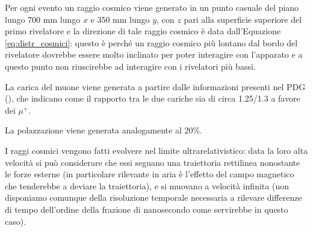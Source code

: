 Per ogni evento un raggio cosmico viene generato in un punto casuale del piano lungo 700 mm lungo $x$ e 350 mm lungo $y$, con $z$ pari alla superficie superiore del primo rivelatore e la direzione di tale raggio cosmico è data dall'Equazione \ref{eq:distr_cosmici}: questo \`e perch\'e un raggio cosmico pi\`u lontano dal bordo del rivelatore dovrebbe essere molto inclinato per poter interagire con l'apparato e a questo punto non riuscirebbe ad interagire con i rivelatori pi\`u bassi.

La carica del muone viene generata a partire dalle informazioni presenti nel PDG (\cite{bib:Patrignani:2016xqp}), che indicano come il rapporto tra le due cariche sia di circa 1.25/1.3 a favore dei $\mu^+$.

La polazzazione viene generata analogamente al 20\%.

I raggi cosmici vengono fatti evolvere nel limite ultrarelativistico: data la loro alta velocità si può considerare che essi seguano una traiettoria rettilinea nonostante
le forze esterne (in particolare rilevante in aria è l'effetto del campo magnetico che tenderebbe a deviare la traiettoria), e si muovano a velocità infinita (non disponiamo comunque della risoluzione temporale necessaria a rilevare differenze di tempo dell'ordine della frazione di nanosecondo come servirebbe in questo caso).
